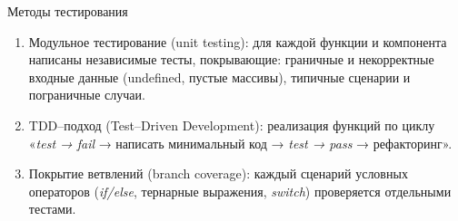 \documentclass[aspectratio=169]{beamer}
\begin{document}
\begin{frame}{Методы тестирования}
\small
\justifying

\begin{enumerate}
  \item Модульное тестирование (unit testing):
    для каждой функции и компонента написаны независимые тесты, покрывающие:
    граничные и некорректные входные данные (undefined, пустые массивы), типичные сценарии и пограничные случаи.
  \item TDD–подход (Test–Driven Development):
    реализация функций по циклу «\textit{test → fail} → написать минимальный код → \textit{test → pass} → рефакторинг».
  \item Покрытие ветвлений (branch coverage):
    каждый сценарий условных операторов (\textit{if/else}, тернарные выражения, \textit{switch}) проверяется отдельными тестами.
\end{enumerate}
\end{frame}
\end{document}
